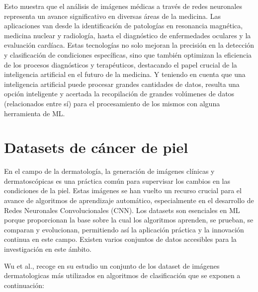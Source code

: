 Esto muestra que el análisis de imágenes médicas a través de redes neuronales representa un avance significativo en diversas áreas de la medicina. Las aplicaciones van desde la identificación de patologías en resonancia magnética, medicina nuclear y radiología, hasta el diagnóstico de enfermedades oculares y la evaluación cardíaca. Estas tecnologías no solo mejoran la precisión en la detección y clasificación de condiciones específicas, sino que también optimizan la eficiencia de los procesos diagnósticos y terapéuticos, destacando el papel crucial de la inteligencia artificial en el futuro de la medicina. Y teniendo en cuenta que una inteligencia artificial puede procesar grandes cantidades de datos, resulta una opción inteligente y acertada la recopilación de grandes volúmenes de datos (relacionados entre sí) para el procesamiento de los mismos con alguna herramienta de ML.

\section{Datasets de cáncer de piel}

En el campo de la dermatología, la generación de imágenes clínicas y dermatoscópicas es una práctica común para supervisar los cambios en las condiciones de la piel. Estas imágenes se han vuelto un recurso crucial para el avance de algoritmos de aprendizaje automático, especialmente en el desarrollo de Redes Neuronales Convolucionales (CNN). Los datasets son esenciales en ML porque proporcionan la base sobre la cual los algoritmos aprenden, se prueban, se comparan y evolucionan, permitiendo así la aplicación práctica y la innovación continua en este campo. Existen varios conjuntos de datos accesibles para la investigación en este ámbito.

Wu et al., recoge en su estudio un conjunto de los dataset de imágenes dermatologicas más utilizados en algoritmos de clasificación que se exponen a continuación:

